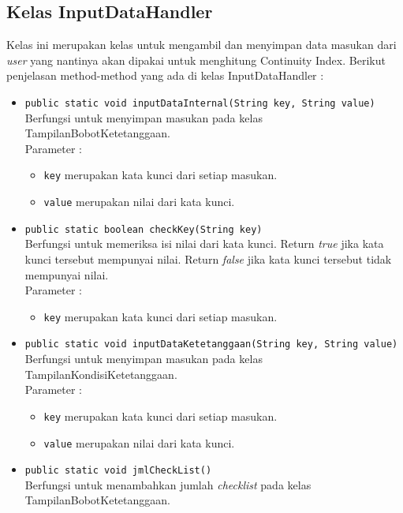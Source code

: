 \subsection{Kelas InputDataHandler}
Kelas ini merupakan kelas untuk mengambil dan menyimpan data masukan dari \textit{user} yang nantinya akan dipakai untuk menghitung Continuity Index.
Berikut penjelasan method-method yang ada di kelas InputDataHandler :
	\begin{itemize}
		\item \texttt{public static void inputDataInternal(String key, String value)}\\
		Berfungsi untuk menyimpan masukan pada kelas TampilanBobotKetetanggaan.\\
		Parameter :
		\begin{itemize}
			\item \texttt{key} merupakan kata kunci dari setiap masukan.
			\item \texttt{value} merupakan nilai dari kata kunci.
		\end{itemize}
		
		\item \texttt{public static boolean checkKey(String key)}\\
		Berfungsi untuk memeriksa isi nilai dari kata kunci. Return \textit{true} jika kata kunci tersebut mempunyai nilai. Return \textit{false} jika kata kunci tersebut tidak mempunyai nilai.\\
		Parameter :
		\begin{itemize}
			\item \texttt{key} merupakan kata kunci dari setiap masukan.
		\end{itemize}
		
		\item \texttt{public static void inputDataKetetanggaan(String key, String value)}\\
		Berfungsi untuk menyimpan masukan pada kelas TampilanKondisiKetetanggaan.\\
		Parameter :
		\begin{itemize}
			\item \texttt{key} merupakan kata kunci dari setiap masukan.
			\item \texttt{value} merupakan nilai dari kata kunci.
		\end{itemize}
		
		\item \texttt{public static void jmlCheckList()}\\
		Berfungsi untuk menambahkan jumlah \textit{checklist} pada kelas TampilanBobotKetetanggaan.
		

\end{itemize}

